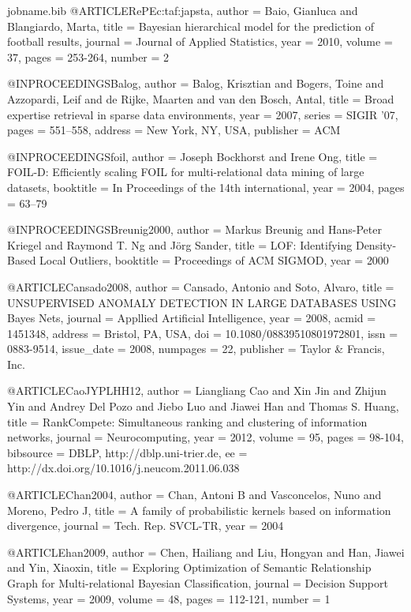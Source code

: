 {\begin{filecontents*}{jobname.bib}
	@ARTICLE{RePEc:taf:japsta,
		author = {Baio, Gianluca and Blangiardo, Marta},
		title = {Bayesian hierarchical model for the prediction of football results},
		journal = {Journal of Applied Statistics},
		year = {2010},
		volume = {37},
		pages = {253-264},
		number = {2}
	}
	
	@INPROCEEDINGS{Balog,
		author = {Balog, Krisztian and Bogers, Toine and Azzopardi, Leif and de Rijke,
			Maarten and van den Bosch, Antal},
		title = {Broad expertise retrieval in sparse data environments},
		year = {2007},
		series = {SIGIR '07},
		pages = {551--558},
		address = {New York, NY, USA},
		publisher = {ACM}
	}
	
	@INPROCEEDINGS{foil,
		author = {Joseph Bockhorst and Irene Ong},
		title = {FOIL-D: Efficiently scaling FOIL for multi-relational data mining
			of large datasets},
		booktitle = {In Proceedings of the 14th international},
		year = {2004},
		pages = {63--79}
	}
	
	@INPROCEEDINGS{Breunig2000,
		author = {Markus Breunig and Hans-Peter Kriegel and Raymond T. Ng and Jörg
			Sander},
		title = {LOF: Identifying Density-Based Local Outliers},
		booktitle = { Proceedings of ACM SIGMOD},
		year = {2000}
	}
	
	@ARTICLE{Cansado2008,
		author = {Cansado, Antonio and Soto, Alvaro},
		title = {UNSUPERVISED ANOMALY DETECTION IN LARGE DATABASES USING {Bayes Nets}},
		journal = {Appllied Artificial Intelligence},
		year = {2008},
		acmid = {1451348},
		address = {Bristol, PA, USA},
		doi = {10.1080/08839510801972801},
		issn = {0883-9514},
		issue_date = { 2008},
		numpages = {22},
		publisher = {Taylor \& Francis, Inc.}
	}
	
	@ARTICLE{CaoJYPLHH12,
		author = {Liangliang Cao and Xin Jin and Zhijun Yin and Andrey Del Pozo and
			Jiebo Luo and Jiawei Han and Thomas S. Huang},
		title = {RankCompete: Simultaneous ranking and clustering of information networks},
		journal = {Neurocomputing},
		year = {2012},
		volume = {95},
		pages = {98-104},
		bibsource = {DBLP, http://dblp.uni-trier.de},
		ee = {http://dx.doi.org/10.1016/j.neucom.2011.06.038}
	}
	
	@ARTICLE{Chan2004,
		author = {Chan, Antoni B and Vasconcelos, Nuno and Moreno, Pedro J},
		title = {A family of probabilistic kernels based on information divergence},
		journal = {Tech. Rep. SVCL-TR},
		year = {2004}
	}
	
	@ARTICLE{han2009,
		author = {Chen, Hailiang and Liu, Hongyan and Han, Jiawei and Yin, Xiaoxin},
		title = {Exploring Optimization of Semantic Relationship Graph for Multi-relational
			{B}ayesian Classification},
		journal = {Decision Support Systems},
		year = {2009},
		volume = {48},
		pages = {112-121},
		number = {1}
	}
	

\end{filecontents*}}
